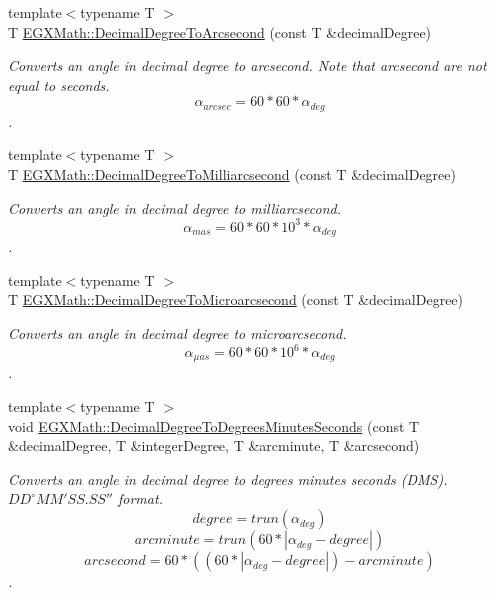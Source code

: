 \begin{DoxyCompactItemize}
{\footnotesize template$<$typename T $>$ }\\T \mbox{\hyperlink{group___e_g_x_math-_conversions-_angle_conversions-_decimal_degree_gab9d5635a6e35127b5245978aba508962}{E\+G\+X\+Math\+::\+Decimal\+Degree\+To\+Arcsecond}} (const T \&decimal\+Degree)
\begin{DoxyCompactList}\small\item\em Converts an angle in decimal degree to arcsecond. Note that arcsecond are not equal to seconds. \[\alpha_{arcsec}=60 * 60 * \alpha_{deg}\]. \end{DoxyCompactList}\item 
{\footnotesize template$<$typename T $>$ }\\T \mbox{\hyperlink{group___e_g_x_math-_conversions-_angle_conversions-_decimal_degree_gadb9ff3c92cf7484793f91e7de80c222e}{E\+G\+X\+Math\+::\+Decimal\+Degree\+To\+Milliarcsecond}} (const T \&decimal\+Degree)
\begin{DoxyCompactList}\small\item\em Converts an angle in decimal degree to milliarcsecond. \[\alpha_{mas}=60 * 60 * 10^3 * \alpha_{deg} \]. \end{DoxyCompactList}\item 
{\footnotesize template$<$typename T $>$ }\\T \mbox{\hyperlink{group___e_g_x_math-_conversions-_angle_conversions-_decimal_degree_ga6fa88456069907fd24716fa575517571}{E\+G\+X\+Math\+::\+Decimal\+Degree\+To\+Microarcsecond}} (const T \&decimal\+Degree)
\begin{DoxyCompactList}\small\item\em Converts an angle in decimal degree to microarcsecond. \[\alpha_{\mu as}=60 * 60 * 10^6 * \alpha_{deg}\]. \end{DoxyCompactList}\item 
{\footnotesize template$<$typename T $>$ }\\void \mbox{\hyperlink{group___e_g_x_math-_conversions-_angle_conversions-_decimal_degree_gac5a5255c8d120f71b60d8f60de1a1b6e}{E\+G\+X\+Math\+::\+Decimal\+Degree\+To\+Degrees\+Minutes\+Seconds}} (const T \&decimal\+Degree, T \&integer\+Degree, T \&arcminute, T \&arcsecond)
\begin{DoxyCompactList}\small\item\em Converts an angle in decimal degree to degrees minutes seconds (D\+MS). ${DD}^{\circ}{MM}'{SS.SS}''$ format. \[degree=trun(\alpha_{deg})\] \[arcminute=trun(60 * |\alpha_{deg} - degree|)\] \[arcsecond=60 * ((60 * |\alpha_{deg} - degree|)-arcminute)\]. \end{DoxyCompactList}\item 

\end{DoxyCompactItemize}
